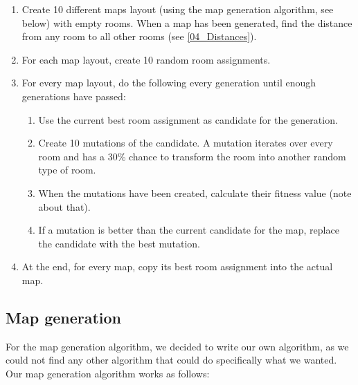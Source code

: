 \begin{enumerate}

	\item Create 10 different maps layout (using the map generation algorithm, see below) with empty rooms. When a map has been generated, find the distance from any room to all other rooms (see \ref{04_Distances}).

	\item For each map layout, create 10 random room assignments.

	\item For every map layout, do the following every generation until enough generations have passed:

	\begin{enumerate}

		\item Use the current best room assignment as candidate for the generation.

		\item Create 10 mutations of the candidate. A mutation iterates over every room and has a 30\% chance to transform the room into another random type of room.

		\item When the mutations have been created, calculate their fitness value (note about that).

		\item If a mutation is better than the current candidate for the map, replace the candidate with the best mutation.

	\end{enumerate}

	\item At the end, for every map, copy its best room assignment into the actual map.

\end{enumerate}

\subsection{Map generation}
\label{04_MapGeneration}

For the map generation algorithm, we decided to write our own algorithm, as we could not find any other algorithm that could do specifically what we wanted. Our map generation algorithm works as follows:

